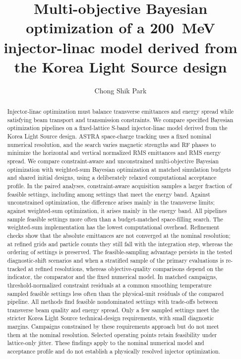 \documentclass[aps,prab,reprint,superscriptaddress,amsmath,amssymb,floatfix]{revtex4-2}
\newcommand{\abstractspacing}{\linespread{1}\selectfont}
\begin{document}
\title{Multi-objective Bayesian optimization of a 200~MeV injector-linac model derived from the
Korea Light Source design}

\author{Chong Shik Park}

\begin{abstract}
\abstractspacing
Injector-linac optimization must balance transverse emittances and energy spread while
satisfying beam transport and transmission constraints. We compare specified Bayesian optimization
pipelines on a fixed-lattice S-band injector-linac model derived from the Korea Light Source
design. ASTRA space-charge tracking uses a fixed nominal numerical resolution, and the search
varies magnetic strengths and RF phases to minimize the horizontal and vertical normalized
RMS emittances and RMS energy spread. We compare constraint-aware and unconstrained
multi-objective Bayesian optimization with weighted-sum Bayesian optimization at matched
simulation budgets and shared initial designs, using a deliberately relaxed computational
acceptance profile. In the paired analyses, constraint-aware acquisition samples a larger
fraction of feasible settings, including among settings that meet the energy band. Against
unconstrained optimization, the difference arises mainly in the transverse limits; against
weighted-sum optimization, it arises mainly in the energy band. All pipelines sample feasible
settings more often than a budget-matched space-filling search. The weighted-sum implementation
has the lowest computational overhead. Refinement checks show that the absolute emittances
are not converged at the nominal resolution; at refined grids and particle counts they still
fall with the integration step, whereas the ordering of settings is preserved. The feasible-sampling advantage persists in the
tested diagnostic-shift scenarios and when a stratified sample of the primary evaluations is
re-tracked at refined resolutions, whereas objective-quality comparisons depend on the indicator,
the comparator and the fixed numerical model. In matched campaigns, threshold-normalized
constraint residuals at a common smoothing temperature sampled feasible settings less often than
the physical-unit residuals of the compared pipeline. All methods find feasible nondominated settings
with trade-offs between transverse beam quality and energy spread. Only a few sampled settings
meet the stricter Korea Light Source technical-design requirements, with small diagnostic
margins. Campaigns constrained by these requirements approach but do not meet them at the nominal
resolution. Selected operating points retain feasibility under lattice-only jitter.
These findings apply to the nominal numerical model and acceptance profile and do not establish
a physically resolved injector optimization.
\end{abstract}
\end{document}
